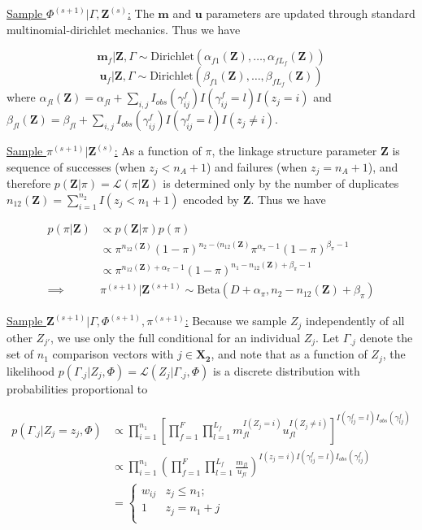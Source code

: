 \documentclass[12pt,letterpaper]{article}
\newcommand{\1}[1]{\mathbb{I}\!\left[#1\right]} %
\begin{document}
\underline{Sample $\Phi^{(s+1)}|\Gamma, \mathbf{Z}^{(s)}$:}
The \(\mathbf{m}\) and \(\mathbf{u}\) parameters are updated through
standard multinomial-dirichlet mechanics. Thus we have

\[\mathbf{m}_f|\mathbf{Z}, \Gamma \sim \text{Dirichlet}(\alpha_{f1}(\mathbf{Z}), \ldots, \alpha_{fL_f}(\mathbf{Z}))\]
\[\mathbf{u}_f|\mathbf{Z}, \Gamma \sim \text{Dirichlet}(\beta_{f1}(\mathbf{Z}), \ldots, \beta_{fL_f}(\mathbf{Z}))\]
where
\(\alpha_{fl}(\mathbf{Z})= \alpha_{fl} + \sum_{i,j} I_{obs}(\gamma_{ij}^f)I(\gamma_{ij}^f = l) I(z_j = i)\)
and
\(\beta_{fl}(\mathbf{Z})= \beta_{fl} + \sum_{i,j} I_{obs}(\gamma_{ij}^f)I(\gamma_{ij}^f = l) I(z_j \neq i)\).

\underline{Sample $\pi^{(s+1)}|\mathbf{Z}^{(s)}$:} As a function of
\(\pi\), the linkage structure parameter \(\mathbf{Z}\) is sequence
of successes (when \(z_j < n_A + 1\)) and failures (when
\(z_j = n_A + 1\)), and therefore
\(p(\mathbf{Z}|\pi) = \mathcal{L}(\pi|\mathbf{Z})\) is
determined only by the number of duplicates
$n_{12}(\mathbf{Z}) = \sum_{i=1}^{n_2}I(z_j < n_1 + 1)$ encoded by
$\mathbf{Z}$. Thus we have

\begin{align*}
p(\pi | \mathbf{Z}) &\propto p(\mathbf{Z}|\pi)p(\pi) \\
&\propto \pi^{n_{12}(\mathbf{Z})} (1-\pi)^{n_2 - (n_{12}(\mathbf{Z})} \pi^{\alpha_{\pi} -1} (1-\pi)^{\beta_{\pi} -1} \\
&\propto \pi^{n_{12}(\mathbf{Z}) + \alpha_{\pi} - 1} (1-\pi)^{n_1 - n_{12}(\mathbf{Z}) + \beta_{\pi} -1} \\
\implies &\pi^{(s+1)}|\mathbf{Z}^{(s+1)} \sim \text{Beta}(D + \alpha_{\pi}, n_2 - n_{12}(\mathbf{Z}) + \beta_{\pi})
\end{align*}

\underline{Sample $\mathbf{Z}^{(s+1)}|\Gamma, \Phi^{(s+1)}, \pi^{(s+1)}$:}
Because we sample \(Z_j\) independently of all other \(Z_{j'}\), we use
only the full conditional for an individual \(Z_j\). Let \(\Gamma_{.j}\)
denote the set of \(n_1\) comparison vectors with \(j \in \bm{X_2}\), and note that as a function of \(Z_j\), the likelihood
\(p(\Gamma_{.j}|Z_j, \Phi) = \mathcal{L}(Z_j|\Gamma_{.j}, \Phi)\)
is a discrete distribution with probabilities proportional to

\begin{align*}
	p(\Gamma_{.j}|Z_j = z_j, \Phi) &\propto \prod_{i=1}^{n_1}\left[\prod_{f=1}^{F}\prod_{l=1}^{L_f} m_{fl}^{I(Z_j = i)}u_{fl}^{I(Z_j \neq i)}\right]^{I(\gamma_{ij}^f = l)I_{obs}(\gamma_{ij}^f)}\\
	&\propto \prod_{i=1}^{n_1}\left(\prod_{f=1}^{F}\prod_{l=1}^{L_f} \frac{m_{fl}}{u_{fl}}\right)^{I(z_j = i) I(\gamma_{ij}^f = l)I_{obs}(\gamma_{ij}^f)} \\
	&=
	\begin{cases} 
		w_{ij}  & z_j \leq n_1; \\
		1 &  z_j  = n_1 + j \\
	\end{cases}\\
\end{align*}
\end{document}
